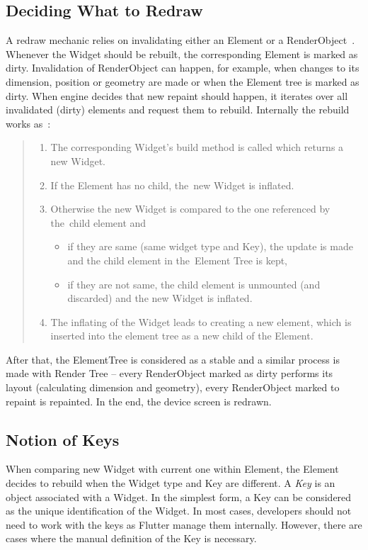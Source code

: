 \subsection{Deciding What to Redraw}
A redraw mechanic relies on invalidating either an Element or a RenderObject~\cite{didier-internals}.  Whenever the Widget should be rebuilt, the corresponding Element is marked as dirty. Invalidation of RenderObject can happen, for example, when changes to its dimension, position or geometry are made or when the Element tree is marked as dirty. When engine decides that new repaint should happen, it iterates over all invalidated (dirty) elements and request them to rebuild. Internally the rebuild works as~\cite{didier-internals}:
\begin{quote}
    \begin{enumerate}
    \item The corresponding Widget's build method is called which returns a new Widget.
    \item If the Element has no child, the~new Widget is inflated.
    \item Otherwise the new Widget is compared to the one referenced by the~child element and
        \begin{itemize}
        \item if they are same (same widget type and Key), the update is made and the child element in the~Element Tree is kept,
        \item if they are not same, the child element is unmounted (and discarded) and the new Widget is inflated.
        \end{itemize}
    \item The inflating of the Widget leads to creating a new element, which is inserted into the element tree as a new child of the Element. 
    \end{enumerate}
\end{quote}


After that, the ElementTree is considered as a stable and a similar process is made with Render Tree -- every RenderObject marked as dirty performs its layout (calculating dimension and geometry), every RenderObject marked to repaint is repainted. In the end, the device screen is redrawn. 
\subsection{Notion of Keys}
When comparing new Widget with current one within Element, the Element decides to rebuild when the Widget type and Key are different. A \textit{Key} is an object associated with a Widget. In the simplest form, a Key can be considered as the unique identification of the Widget. In most cases, developers should not need to work with the keys as Flutter manage them internally. However, there are cases where the manual definition of the Key is necessary. 

